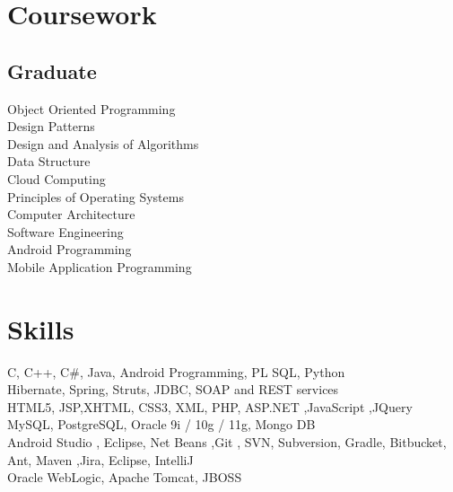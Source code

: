 \documentclass[]{deedy-resume-openfont}
\begin{document}
\begin{minipage}[t]{0.33\textwidth}
\sectionsep


\section{Coursework}
\subsection{Graduate}
Object Oriented Programming \\
Design Patterns \\
Design and Analysis of Algorithms \\
Data Structure\\
Cloud Computing \\
Principles of Operating Systems \\
Computer Architecture\\
Software Engineering \\
Android Programming\\
Mobile Application Programming \\
\sectionsep



\section{Skills}
C, C++, C\#, Java, Android Programming, PL SQL, Python \\
Hibernate, Spring, Struts, JDBC, SOAP and REST services \\
HTML5, JSP,XHTML, CSS3, XML, PHP, ASP.NET ,JavaScript ,JQuery\\
MySQL, PostgreSQL, Oracle 9i / 10g / 11g, Mongo DB \\
Android Studio , Eclipse, Net Beans ,Git , SVN, Subversion, Gradle, Bitbucket, Ant, Maven ,Jira, Eclipse, IntelliJ \\
Oracle WebLogic, Apache Tomcat, JBOSS\\

\sectionsep

%
%

\end{minipage}
\end{document}

